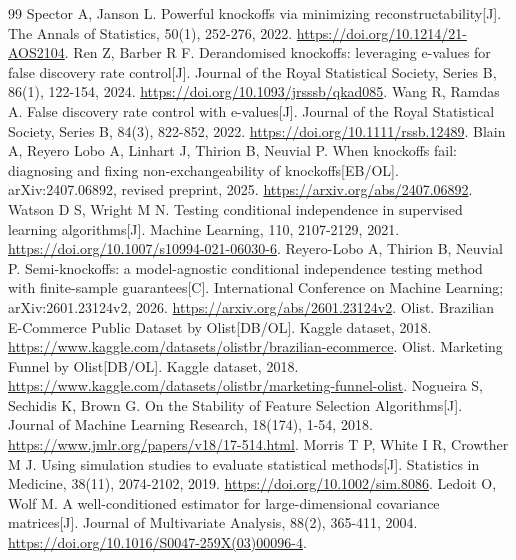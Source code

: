 \documentclass[UTF8,11pt,a4paper]{ctexart}
\begin{document}
\begin{thebibliography}{99}
 Spector A, Janson L. Powerful knockoffs via minimizing reconstructability[J]. The Annals of Statistics, 50(1), 252-276, 2022. \url{https://doi.org/10.1214/21-AOS2104}.
 Ren Z, Barber R F. Derandomised knockoffs: leveraging e-values for false discovery rate control[J]. Journal of the Royal Statistical Society, Series B, 86(1), 122-154, 2024. \url{https://doi.org/10.1093/jrsssb/qkad085}.
 Wang R, Ramdas A. False discovery rate control with e-values[J]. Journal of the Royal Statistical Society, Series B, 84(3), 822-852, 2022. \url{https://doi.org/10.1111/rssb.12489}.
 Blain A, Reyero Lobo A, Linhart J, Thirion B, Neuvial P. When knockoffs fail: diagnosing and fixing non-exchangeability of knockoffs[EB/OL]. arXiv:2407.06892, revised preprint, 2025. \url{https://arxiv.org/abs/2407.06892}.
 Watson D S, Wright M N. Testing conditional independence in supervised learning algorithms[J]. Machine Learning, 110, 2107-2129, 2021. \url{https://doi.org/10.1007/s10994-021-06030-6}.
 Reyero-Lobo A, Thirion B, Neuvial P. Semi-knockoffs: a model-agnostic conditional independence testing method with finite-sample guarantees[C]. International Conference on Machine Learning; arXiv:2601.23124v2, 2026. \url{https://arxiv.org/abs/2601.23124v2}.
 Olist. Brazilian E-Commerce Public Dataset by Olist[DB/OL]. Kaggle dataset, 2018. \url{https://www.kaggle.com/datasets/olistbr/brazilian-ecommerce}.
 Olist. Marketing Funnel by Olist[DB/OL]. Kaggle dataset, 2018. \url{https://www.kaggle.com/datasets/olistbr/marketing-funnel-olist}.
 Nogueira S, Sechidis K, Brown G. On the Stability of Feature Selection Algorithms[J]. Journal of Machine Learning Research, 18(174), 1-54, 2018. \url{https://www.jmlr.org/papers/v18/17-514.html}.
 Morris T P, White I R, Crowther M J. Using simulation studies to evaluate statistical methods[J]. Statistics in Medicine, 38(11), 2074-2102, 2019. \url{https://doi.org/10.1002/sim.8086}.
 Ledoit O, Wolf M. A well-conditioned estimator for large-dimensional covariance matrices[J]. Journal of Multivariate Analysis, 88(2), 365-411, 2004. \url{https://doi.org/10.1016/S0047-259X(03)00096-4}.
\end{thebibliography}
\end{document}
